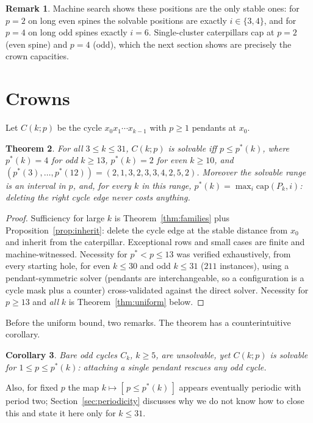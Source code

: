 \documentclass[11pt]{article}
\newtheorem{theorem}{Theorem}[section]
\newtheorem{corollary}[theorem]{Corollary}
\theoremstyle{definition}
\newtheorem{remark}[theorem]{Remark}
\newcommand{\cp}{\mathrm{cap}}
\begin{document}
\begin{remark}
Machine search shows these positions are the only stable ones: for
$p=2$ on long even spines the solvable positions are exactly
$i\in\{3,4\}$, and for $p=4$ on long odd spines exactly $i=6$.
Single-cluster caterpillars cap at $p=2$ (even spine) and $p=4$
(odd), which the next section shows are precisely the crown
capacities.
\end{remark}

\section{Crowns}\label{sec:crowns}

Let $C(k;p)$ be the cycle $x_0x_1\cdots x_{k-1}$ with $p\ge 1$
pendants at $x_0$.

\begin{theorem}\label{thm:crown}
For all $3\le k\le 31$, $C(k;p)$ is solvable iff $p\le p^*(k)$,
where $p^*(k)=4$ for odd $k\ge 13$, $p^*(k)=2$ for even $k\ge 10$,
and $(p^*(3),\dots,p^*(12))=(2,1,3,2,3,3,4,2,5,2)$. Moreover the
solvable range is an interval in $p$, and, for every $k$ in this
range, $p^*(k)=\max_i \cp(P_k,i)$: deleting the right cycle edge
never costs anything.
\end{theorem}

\begin{proof}
Sufficiency for large $k$ is Theorem~\ref{thm:families} plus
Proposition~\ref{prop:inherit}: delete the cycle edge at the stable
distance from $x_0$ and inherit from the caterpillar. Exceptional
rows and small cases are finite and machine-witnessed. Necessity for
$p^*<p\le 13$ was verified exhaustively, from every starting hole,
for even $k\le 30$ and odd $k\le 31$ ($211$ instances), using a
pendant-symmetric solver (pendants are interchangeable, so a
configuration is a cycle mask plus a counter) cross-validated against
the direct solver. Necessity for $p\ge 13$ and \emph{all} $k$ is
Theorem~\ref{thm:uniform} below.
\end{proof}

Before the uniform bound, two remarks. The theorem has a
counterintuitive corollary.

\begin{corollary}\label{cor:rescue-odd}
Bare odd cycles $C_k$, $k\ge 5$, are unsolvable, yet $C(k;p)$ is
solvable for $1\le p\le p^*(k)$: attaching a single pendant rescues
any odd cycle.
\end{corollary}

Also, for fixed $p$ the map $k\mapsto[\,p\le p^*(k)\,]$ appears
eventually periodic with period two; Section~\ref{sec:periodicity}
discusses why we do not know how to close this and state it here
only for $k\le 31$.
\end{document}
